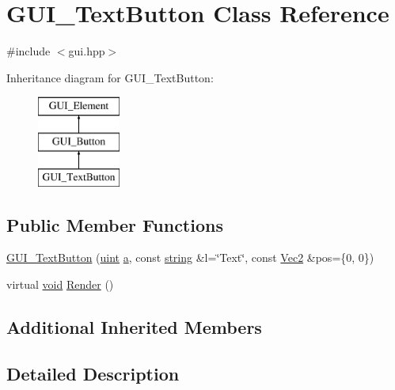 \hypertarget{class_g_u_i___text_button}{\section{G\-U\-I\-\_\-\-Text\-Button Class Reference}
\label{class_g_u_i___text_button}
}


{\ttfamily \#include $<$gui.\-hpp$>$}

Inheritance diagram for G\-U\-I\-\_\-\-Text\-Button\-:\begin{figure}[H]
\begin{center}
\leavevmode
\includegraphics[height=3.000000cm]{class_g_u_i___text_button}
\end{center}
\end{figure}
\subsection*{Public Member Functions}
\begin{DoxyCompactItemize}
\item 
\hyperlink{class_g_u_i___text_button_a4d3e179027a47e734d4cb74676d727de}{G\-U\-I\-\_\-\-Text\-Button} (\hyperlink{common_8hpp_a69aa29b598b851b0640aa225a9e5d61d}{uint} \hyperlink{_s_d_l__opengl__glext_8h_a3309789fc188587d666cda5ece79cf82}{a}, const \hyperlink{_s_d_l__opengl__glext_8h_ae84541b4f3d8e1ea24ec0f466a8c568b}{string} \&l=\char`\"{}Text\char`\"{}, const \hyperlink{class_vec2}{Vec2} \&pos=\{0, 0\})
\item 
virtual \hyperlink{_s_d_l__opengles2__gl2ext_8h_ae5d8fa23ad07c48bb609509eae494c95}{void} \hyperlink{class_g_u_i___text_button_a160fa50b3f12b0003f8835c04cf5b373}{Render} ()
\end{DoxyCompactItemize}
\subsection*{Additional Inherited Members}


\subsection{Detailed Description}


